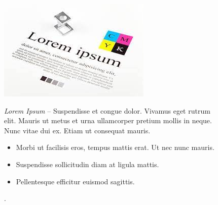 \documentclass{beamer}
\begin{document}
\begin{frame}

\begin{figure}[htp]
\begin{minipage}{0.33\textwidth}
\centering
\includegraphics[width=\textwidth]{foto4.jpeg}
\end{minipage}
\begin{minipage}{0.66\textwidth}
\centering
\textit{Lorem Ipsum} – Suspendisse et congue dolor. Vivamus eget rutrum elit. Mauris ut metus et urna ullamcorper pretium mollis in 
neque. Nunc vitae dui ex. Etiam ut consequat mauris. \begin{itemize}
    \item Morbi ut facilisis eros, tempus mattis erat. Ut nec nunc mauris.
    \item Suspendisse sollicitudin diam at ligula mattis.
    \item Pellentesque efficitur euismod sagittis.
\end{itemize}.
\end{minipage}

\end{figure}
\end{frame}
\begin{frame}


\framebreak
\tableofcontent

\end{frame}
\end{document}
